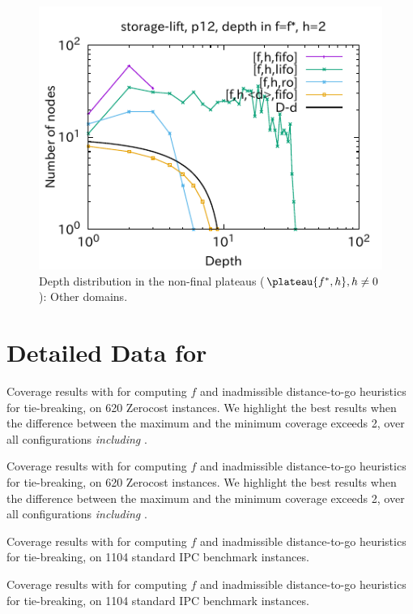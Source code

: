 \begin{figure}[htb]
\includegraphics[width=0.4\linewidth]{img/output-lmcut/storage-lift/p12-2.pdf}
 \caption{Depth distribution in the non-final plateaus ($\plateau{f^*,h}, h\not=0$): Other domains.}
 \label{fig:depth-histogram5}
\end{figure}

\clearpage
\section{Detailed Data for }

\setlength{\tabcolsep}{0.1em}

\begin{table}[htb]
 {
 \centering
 
 \caption{
 Coverage results with { \lmcut for computing $f$ and inadmissible distance-to-go heuristics for tie-breaking, on 620 Zerocost instances}. We highlight the best results when the difference between the maximum and the minimum coverage exceeds 2, over all configurations \emph{including }.
 }
 \label{tbl:dtg-lmcut-zero}
 }
\end{table}

\begin{table}[htb]
 {
 \centering
 
 \caption{
 Coverage results with \mands for computing $f$ and inadmissible distance-to-go heuristics for tie-breaking, on 620 Zerocost instances. We highlight the best results when the difference between the maximum and the minimum coverage exceeds 2, over all configurations \emph{including }.
 }
 \label{tbl:dtg-mands-zero}
 }
\end{table}

\begin{table}[htb]
 {
 \centering
 
 \caption{
 Coverage results with \lmcut for computing $f$ and inadmissible distance-to-go heuristics for tie-breaking, on 1104 standard IPC benchmark instances.
 }
 \label{tbl:dtg-lmcut-ipc}
 }
\end{table}

\begin{table}[htb]
 {
 \centering
 
 \caption{
 Coverage results with \mands for computing $f$ and inadmissible distance-to-go heuristics for tie-breaking, on 1104 standard IPC benchmark instances.
 }
 \label{tbl:dtg-mands-ipc} }
\end{table}
